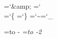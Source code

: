 \chardef\AM=`\&amp; %
\chardef\BS=`\\ %
\chardef\LB=`\{ %
\def\LQ{{\tt\char'22}} %
\chardef\RB=`\} %
\def\RQ{{\tt\char'23}} %
\def\SP{{\tt\char`\ }} %
\chardef\TL=`\~ %
\chardef\UL=`\_ %

\newbox\bak \setbox\bak=\hbox to -\em{} %
\newbox\bakk\setbox\bakk=\hbox to -2\em{} %

\newcount\ind %
\def\1{\global\advance\ind by1\hangindent\ind\em} %
\def\2{\global\advance\ind by-1} %
\def\3#1{\hfil\penalty#10\hfilneg} %
\def\4{\copy\bak} %
\def\5{\hfil\penalty-1\hfilneg\kern2.5\em\copy\bakk\ignorespaces}%
\def\6{\ifmmode\else\par %
  \hangindent\ind\em\noindent\kern\ind\em\copy\bakk\ignorespaces\fi}
\def\7{\Y\6} %

